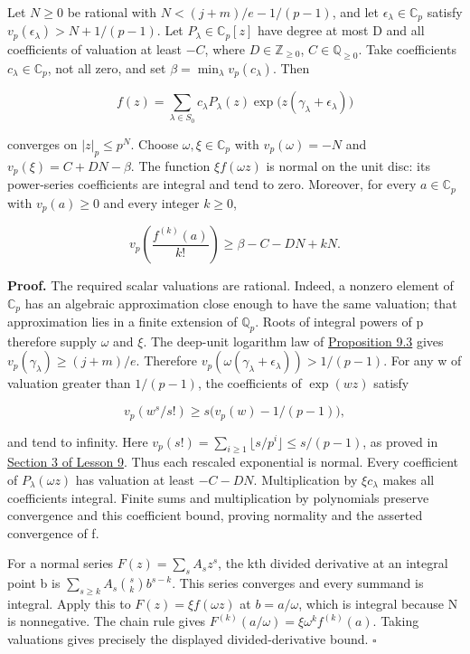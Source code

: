 \documentclass[
  11pt,
  a4paper,
]{article}
\begin{document}
Let \(N\ge0\) be rational with \(N<(j+m)/e-1/(p-1)\), and let
\(\epsilon_\lambda\in\mathbb C_p\) satisfy
\(v_p(\epsilon_\lambda)>N+1/(p-1)\). Let \(P_\lambda\in\mathbb C_p[z]\)
have degree at most D and all coefficients of valuation at least \(-C\),
where \(D\in\mathbb Z_{\ge0}\), \(C\in\mathbb Q_{\ge0}\). Take
coefficients \(c_\lambda\in\mathbb C_p\), not all zero, and set
\(\beta=\min_\lambda v_p(c_\lambda)\). Then

\[
f(z)=\sum_{\lambda\in S_0}c_\lambda P_\lambda(z)
                 \exp\bigl(z(\gamma_\lambda+\epsilon_\lambda)\bigr)
\tag{10.674}
\]

converges on \(|z|_p\le p^N\). Choose \(\omega,\xi\in\mathbb C_p\) with
\(v_p(\omega)=-N\) and \(v_p(\xi)=C+DN-\beta\). The function
\(\xi f(\omega z)\) is normal on the unit disc: its power-series
coefficients are integral and tend to zero. Moreover, for every
\(a\in\mathbb C_p\) with \(v_p(a)\ge0\) and every integer \(k\ge0\),

\[
v_p\left(\frac{f^{(k)}(a)}{k!}\right)
\ge\beta-C-DN+kN.
\tag{10.675}
\]

\textbf{Proof.} The required scalar valuations are rational. Indeed, a
nonzero element of \(\mathbb C_p\) has an algebraic approximation close
enough to have the same valuation; that approximation lies in a finite
extension of \(\mathbb Q_p\). Roots of integral powers of p therefore
supply \(\omega\) and \(\xi\). The deep-unit logarithm law of
\href{../TR-BAKER-09.html\#3-the-exponential-and-the-logarithm}{Proposition
9.3} gives \(v_p(\gamma_\lambda)\ge(j+m)/e\). Therefore
\(v_p(\omega(\gamma_\lambda+\epsilon_\lambda))>1/(p-1)\). For any w of
valuation greater than \(1/(p-1)\), the coefficients of \(\exp(wz)\)
satisfy

\[
v_p(w^s/s!)\ge s\bigl(v_p(w)-1/(p-1)\bigr),
\tag{10.676}
\]

and tend to infinity. Here
\(v_p(s!)=\sum_{i\ge1}\lfloor s/p^i\rfloor\le s/(p-1)\), as proved in
\href{../TR-BAKER-09.html\#3-the-exponential-and-the-logarithm}{Section
3 of Lesson 9}. Thus each rescaled exponential is normal. Every
coefficient of \(P_\lambda(\omega z)\) has valuation at least \(-C-DN\).
Multiplication by \(\xi c_\lambda\) makes all coefficients integral.
Finite sums and multiplication by polynomials preserve convergence and
this coefficient bound, proving normality and the asserted convergence
of f.

For a normal series \(F(z)=\sum_s A_sz^s\), the kth divided derivative
at an integral point b is \(\sum_{s\ge k}A_s\binom sk b^{s-k}\). This
series converges and every summand is integral. Apply this to
\(F(z)=\xi f(\omega z)\) at \(b=a/\omega\), which is integral because N
is nonnegative. The chain rule gives
\(F^{(k)}(a/\omega)=\xi\omega^k f^{(k)}(a)\). Taking valuations gives
precisely the displayed divided-derivative bound. \(\square\)
\end{document}
